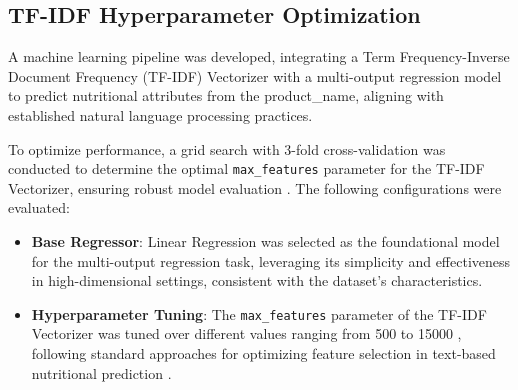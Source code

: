 \subsection{TF-IDF Hyperparameter Optimization}
A machine learning pipeline was developed, integrating a Term Frequency-Inverse Document Frequency (TF-IDF) Vectorizer with a multi-output regression model to predict nutritional attributes from the product\_name, aligning with established natural language processing practices.
\par To optimize performance, a grid search with 3-fold cross-validation was conducted to determine the optimal \texttt{max\_features} parameter for the TF-IDF Vectorizer, ensuring robust model evaluation \cite{hastie2009elements}. The following configurations were evaluated:

\begin{itemize}
    \item \textbf{Base Regressor}: Linear Regression was selected as the foundational model for the multi-output regression task, leveraging its simplicity and effectiveness in high-dimensional settings, consistent with the dataset's characteristics.
    \item \textbf{Hyperparameter Tuning}: The \texttt{max\_features} parameter of the TF-IDF Vectorizer was tuned over different values ranging from 500 to 15000 , following standard approaches for optimizing feature selection in text-based nutritional prediction \cite{aionlinecourse2025}.
\end{itemize}


